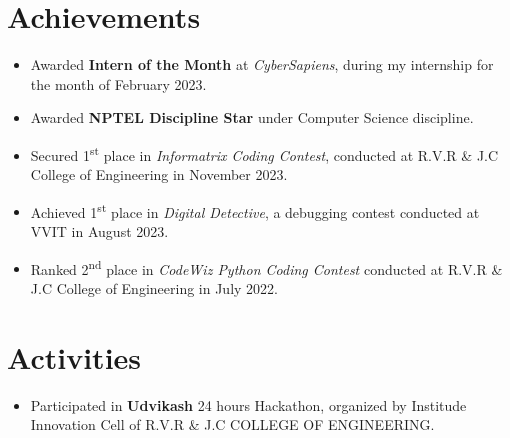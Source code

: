 \documentclass[]{roshan-resume}
\begin{document}
\begin{minipage}[t]{0.66\textwidth}
		
		\section{Achievements} 
		\begin{itemize}
			\item Awarded \textbf{Intern of the Month} at \textit{CyberSapiens}, during my internship for the month of February 2023.
			\item Awarded \textbf{NPTEL Discipline Star} under Computer Science discipline.
			\item Secured 1\textsuperscript{st} place in \textit{Informatrix Coding Contest}, conducted at R.V.R \& J.C College of Engineering in November 2023.
			\item Achieved 1\textsuperscript{st} place in \textit{Digital Detective}, a debugging contest conducted at VVIT in August 2023.
			\item Ranked 2\textsuperscript{nd} place in \textit{CodeWiz Python Coding Contest} conducted at R.V.R \& J.C College of Engineering in July 2022.
		\end{itemize}
		
		

		\section{Activities}
		\begin{itemize}
			\item Participated in \textbf{Udvikash} 24 hours Hackathon, organized by Institude Innovation Cell of R.V.R \& J.C COLLEGE OF ENGINEERING.
		\end{itemize}
		
	\end{minipage} 
\end{document}
